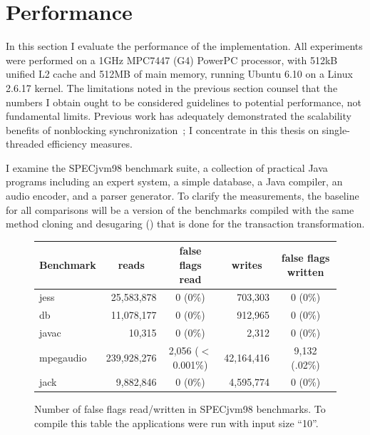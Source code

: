 \section{Performance}\label{sec:full-bench}
In this section I evaluate the performance of the \apex implementation.
All experiments were performed on a 1GHz MPC7447 (G4) PowerPC processor,
with 512kB unified L2 cache and 512MB of main memory, running Ubuntu
6.10 on a Linux 2.6.17 kernel.  The limitations noted in the previous
section counsel that the numbers I obtain ought to be considered
guidelines to potential performance, not fundamental limits.
Previous work has adequately demonstrated the scalability
benefits of nonblocking synchronization~\cite{LaMarca94,GreenwaldCh96,MassalinPu91,RajwarGo01,RajwarGo02,HammondWoCh04,AnanianAsKuLeLi05};
I concentrate in this thesis on single-threaded efficiency measures.

I examine the SPECjvm98 benchmark suite, a collection of
practical Java programs including an expert system, a simple database,
a Java compiler, an audio encoder, and a parser generator.  To clarify
the measurements, the baseline for all comparisons will be a
version of the benchmarks compiled with the same method cloning and
desugaring () that is done for the transaction
transformation.


\begin{figure}\small %
\begin{tabular}{|l||r|c||r|c|}
Benchmark &\multicolumn{1}{c|}{reads}& false flags read &\multicolumn{1}{c|}{writes}& false flags written
\\ \hline
jess &      25,583,878 & 0  (0\%)&  703,303  &  0  (0\%) \\
db &        11,078,177 & 0  (0\%)&  912,965  &  0  (0\%) \\
javac &         10,315 & 0  (0\%)&    2,312  &  0  (0\%) \\
mpegaudio& 239,928,276 & 2,056  ($<$0.001\%)&  42,164,416  &  9,132 (.02\%) \\
jack &       9,882,846 & 0  (0\%)& 4,595,774 &  0 (0\%) \\ \hline
\end{tabular}
\caption[Number of false flags read/written in SPECjvm98 benchmarks.]
{Number of false flags read/written in SPECjvm98 benchmarks.  To
  compile this table the
  applications were run with input size ``10''.}
\label{fig:false-flag}
\end{figure}

